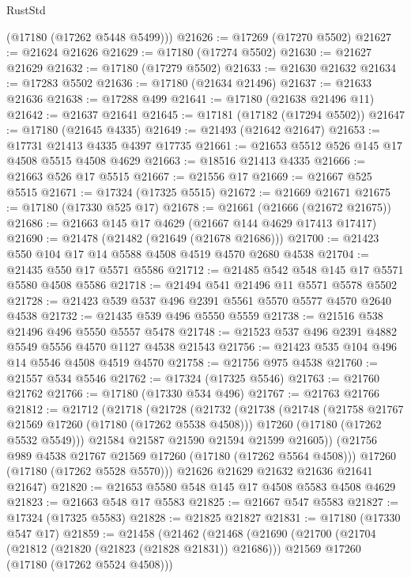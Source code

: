 \begin{lexlean}{RustStd}
\begin{coremodule}
{\begin{coremodule}
{{{{{{{{{{{{{{{{{{{{{{{{{{{{{{{{{{{{{{{{{{{{{{{{{{{{{{{      (@17180 (@17262 @5448 @5499)))
@21626 := @17269 (@17270 @5502)
@21627 := @21624 @21626
@21629 := @17180 (@17274 @5502)
@21630 := @21627 @21629
@21632 := @17180 (@17279 @5502)
@21633 := @21630 @21632
@21634 := @17283 @5502
@21636 := @17180 (@21634 @21496)
@21637 := @21633 @21636
@21638 := @17288 @499
@21641 := @17180 (@21638 @21496 @11)
@21642 := @21637 @21641
@21645 := @17181 (@17182 (@17294 @5502))
@21647 := @17180 (@21645 @4335)
@21649 := @21493 (@21642 @21647)
@21653 := @17731 @21413 @4335 @4397 @17735
@21661 := @21653 @5512 @526 @145 @17 @4508 @5515 @4508 @4629
@21663 := @18516 @21413 @4335
@21666 := @21663 @526 @17 @5515
@21667 := @21556 @17
@21669 := @21667 @525 @5515
@21671 := @17324 (@17325 @5515)
@21672 := @21669 @21671
@21675 := @17180 (@17330 @525 @17)
@21678 := @21661 (@21666 (@21672 @21675))
@21686 := @21663 @145 @17 @4629 (@21667 @144 @4629 @17413 @17417)
@21690 := @21478 (@21482 (@21649 (@21678 @21686)))
@21700 := @21423 @550 @104 @17 @14 @5588 @4508 @4519 @4570 @2680 @4538
@21704 := @21435 @550 @17 @5571 @5586
@21712 := @21485 @542 @548 @145 @17 @5571 @5580 @4508 @5586
@21718 := @21494 @541 @21496 @11 @5571 @5578 @5502
@21728 := @21423 @539 @537 @496 @2391 @5561 @5570 @5577 @4570 @2640 @4538
@21732 := @21435 @539 @496 @5550 @5559
@21738 := @21516 @538 @21496 @496 @5550 @5557 @5478
@21748 := @21523 @537 @496 @2391 @4882 @5549 @5556 @4570 @1127 @4538 @21543
@21756 := @21423 @535 @104 @496 @14 @5546 @4508 @4519 @4570
@21758 := @21756 @975 @4538
@21760 := @21557 @534 @5546
@21762 := @17324 (@17325 @5546)
@21763 := @21760 @21762
@21766 := @17180 (@17330 @534 @496)
@21767 := @21763 @21766
@21812 := @21712
    (@21718
      (@21728
        (@21732
          (@21738
            (@21748
              (@21758 @21767 @21569 @17260 (@17180 (@17262 @5538 @4508)))
              @17260
              (@17180 (@17262 @5532 @5549)))
            @21584
            @21587
            @21590
            @21594
            @21599
            @21605))
        (@21756 @989 @4538 @21767 @21569 @17260 (@17180 (@17262 @5564 @4508)))
        @17260
        (@17180 (@17262 @5528 @5570)))
      @21626
      @21629
      @21632
      @21636
      @21641
      @21647)
@21820 := @21653 @5580 @548 @145 @17 @4508 @5583 @4508 @4629
@21823 := @21663 @548 @17 @5583
@21825 := @21667 @547 @5583
@21827 := @17324 (@17325 @5583)
@21828 := @21825 @21827
@21831 := @17180 (@17330 @547 @17)
@21859 := @21458
    (@21462
      (@21468
        (@21690
          (@21700
            (@21704 (@21812 (@21820 (@21823 (@21828 @21831)) @21686)))
            @21569
            @17260
            (@17180 (@17262 @5524 @4508)))
}}}}}}}}}}}}}}}}}}}}}}}}}}}}}}}}}}}}}}}}}}}}}}}}}}}}}}}
\end{coremodule}}
\end{coremodule}
\end{lexlean}
